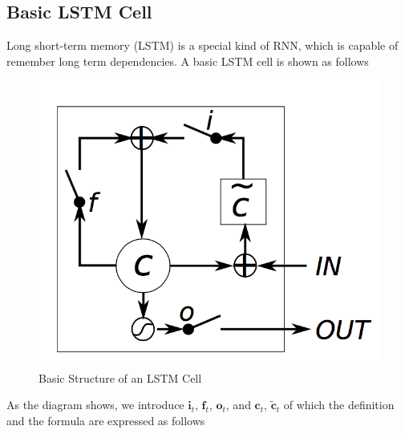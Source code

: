 \documentclass[10pt]{article}
\begin{document}
\subsection{Basic LSTM Cell}
Long short-term memory (LSTM) \cite{hochreiter1997long} is a special kind of RNN, which is capable of remember long term dependencies. A basic LSTM cell is shown as follows
\begin{figure}[H]
\centering
\includegraphics[scale=.6]{lstm.png}
\caption{Basic Structure of an LSTM Cell}
\label{lstm}
\end{figure}
As the diagram shows, we introduce $\mathbf{i}_t$, $\mathbf{f}_t$, $\mathbf{o}_t$, and $\mathbf{c}_t$, $\tilde{\mathbf{c}}_t$ of which the definition and the formula are expressed as follows
\end{document}

